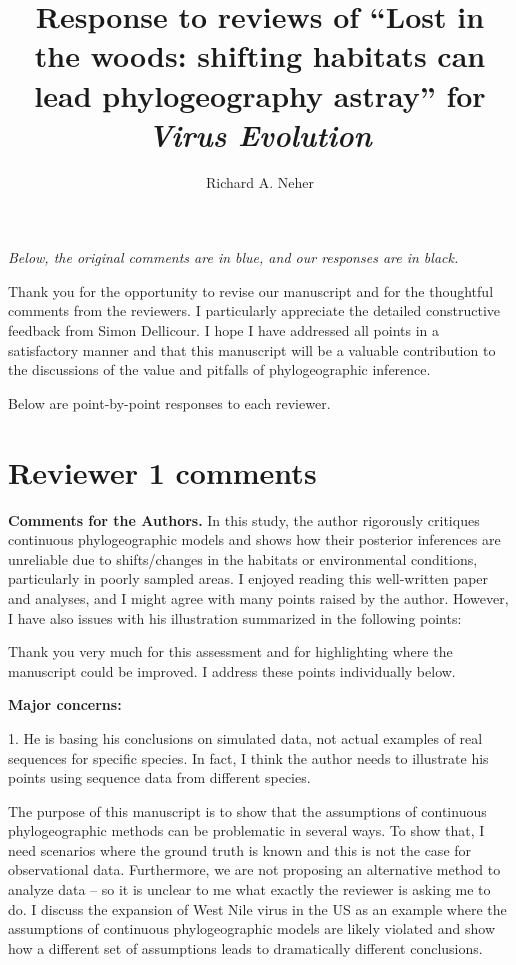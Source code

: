 \documentclass[11pt, oneside]{article}   	%
\title{Response to reviews of ``Lost in the woods: shifting habitats can lead phylogeography astray'' for \textit{Virus Evolution}}
\author{
Richard A. Neher
}
\newcommand{\response}[1]{{\color{black}{\bf Response:} #1}}
\begin{document}
\maketitle

\emph{Below, the original comments {\color{blue} are in blue}, and our responses are in black.}

\color{blue}

\response{
Thank you for the opportunity to revise our manuscript and for the thoughtful comments from the reviewers.
I particularly appreciate the detailed constructive feedback from Simon Dellicour.
I hope I have addressed all points in a satisfactory manner and that this manuscript will be a valuable contribution to the discussions of the value and pitfalls of phylogeographic inference.

Below are point-by-point responses to each reviewer.
}

\section*{Reviewer 1 comments}

{\bf Comments for the Authors.}
In this study, the author rigorously critiques continuous phylogeographic models and shows how their posterior inferences are unreliable due to shifts/changes in the habitats or environmental conditions, particularly in poorly sampled areas. I enjoyed reading this well-written paper and analyses, and I might agree with many points raised by the author. However, I have also issues with his illustration summarized in the following points:

\response{Thank you very much for this assessment and for highlighting where the manuscript could be improved. I address these points individually below.}


{\bf Major concerns:}

1. He is basing his conclusions on simulated data, not actual examples of real sequences for specific species. In fact, I think the author needs to illustrate his points using sequence data from different species.

\response{The purpose of this manuscript is to show that the assumptions of continuous phylogeographic methods can be problematic in several ways. To show that, I need scenarios where the ground truth is known and this is not the case for observational data.
Furthermore, we are not proposing an alternative method to analyze data -- so it is unclear to me what exactly the reviewer is asking me to do.
I discuss the expansion of West Nile virus in the US as an example where the assumptions of continuous phylogeographic models are likely violated and show how a different set of assumptions leads to dramatically different conclusions.
}
\end{document}
